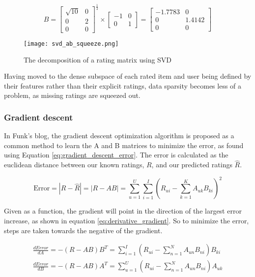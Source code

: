 \begin{equation}\label{eq:svd_AB_num_squeezing_B}
B = \begin{bmatrix}
\sqrt{10} & 0\\ 
0 & 2\\ 
0 & 0
\end{bmatrix}^{\frac{1}{2}} \times
\begin{bmatrix}
-1 & 0\\ 
0 & 1
\end{bmatrix} =
\begin{bmatrix}
-1.7783 & 0\\ 
0 & 1.4142\\ 
0 & 0
\end{bmatrix}
\end{equation}

\begin{figure} [H] \label{fig:svdSqueeze}
	\centering
	\texttt{[image: svd\_ab\_squeeze.png]}
	\caption{The decomposition of a rating matrix using SVD}
\end{figure}
Having moved to the dense subspace of each rated item and user being defined by their features rather than their explicit ratings, data sparsity becomes less of a problem, as missing ratings are squeezed out.

\subsubsection{Gradient descent}
In Funk's blog, the gradient descent optimization algorithm is proposed as a common method to learn the A and B matrices to minimize the error, as found using Equation \ref{eq:gradient_descent_error}. The error is calculated as the euclidean distance between our known ratings, $R$, and our predicted ratings $\hat{R}$.

\begin{equation}\label{eq:gradient_descent_error}
\text{Error} = |R-\hat{R}| = |R - AB| = \sum_{u=1}^{U}\sum_{i=1}^{I}\left (R_{ui}- \sum_{k=1}^{K} A_{uk}B_{ki} \right )^2
\end{equation}

Given as a function, the gradient will point in the direction of the largest error increase, as shown in equation \ref{eq:derivative_gradient}. So to minimize the error, steps are taken towards the negative of the gradient.

\begin{equation}\label{eq:derivative_gradient}
	\begin{split}
	\frac{dError}{dA}=-(R-AB)B^T = \sum_{i=1}^{I}(R_{ui} - \sum_{n=1}^{N} A_{un}B_{ni})B_{ki}
	\\
	\frac{dError}{dB}=-(R-AB)A^T = \sum_{u=1}^{U}(R_{ui} - \sum_{n=1}^{N} A_{un}B_{ni})A_{uk}
	\end{split}
\end{equation}

